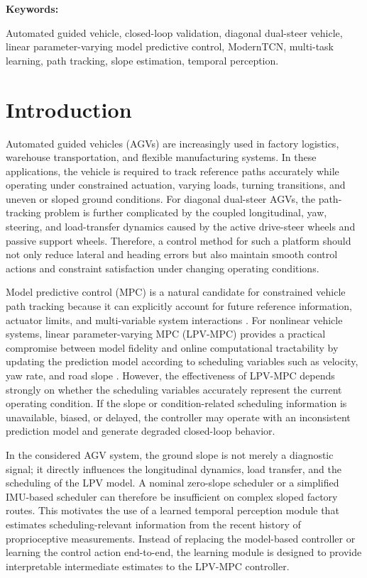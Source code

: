 \documentclass[twocolumn]{article}
\newenvironment{keywords}{\par\vspace{0.5em}\noindent\textbf{Keywords: }}{\par\vspace{0.5em}}
\newcommand{\PARstart}[2]{\noindent #1#2}
\begin{document}
\begin{keywords}

Automated guided vehicle, closed-loop validation, diagonal dual-steer vehicle, linear parameter-varying model predictive control, ModernTCN, multi-task learning, path tracking, slope estimation, temporal perception.

\end{keywords}

\section{Introduction}

\label{sec:introduction}

\PARstart{A}{utomated} guided vehicles (AGVs) are increasingly used in factory logistics, warehouse transportation, and flexible manufacturing systems. In these applications, the vehicle is required to track reference paths accurately while operating under constrained actuation, varying loads, turning transitions, and uneven or sloped ground conditions. For diagonal dual-steer AGVs, the path-tracking problem is further complicated by the coupled longitudinal, yaw, steering, and load-transfer dynamics caused by the active drive-steer wheels and passive support wheels. Therefore, a control method for such a platform should not only reduce lateral and heading errors but also maintain smooth control actions and constraint satisfaction under changing operating conditions.

Model predictive control (MPC) is a natural candidate for constrained vehicle path tracking because it can explicitly account for future reference information, actuator limits, and multi-variable system interactions \cite{Stano2023MPCPathTrackingReview}. For nonlinear vehicle systems, linear parameter-varying MPC (LPV-MPC) provides a practical compromise between model fidelity and online computational tractability by updating the prediction model according to scheduling variables such as velocity, yaw rate, and road slope \cite{Alcala2020LPVMPC}. However, the effectiveness of LPV-MPC depends strongly on whether the scheduling variables accurately represent the current operating condition. If the slope or condition-related scheduling information is unavailable, biased, or delayed, the controller may operate with an inconsistent prediction model and generate degraded closed-loop behavior.

In the considered AGV system, the ground slope is not merely a diagnostic signal; it directly influences the longitudinal dynamics, load transfer, and the scheduling of the LPV model. A nominal zero-slope scheduler or a simplified IMU-based scheduler can therefore be insufficient on complex sloped factory routes. This motivates the use of a learned temporal perception module that estimates scheduling-relevant information from the recent history of proprioceptive measurements. Instead of replacing the model-based controller or learning the control action end-to-end, the learning module is designed to provide interpretable intermediate estimates to the LPV-MPC controller.
\end{document}
